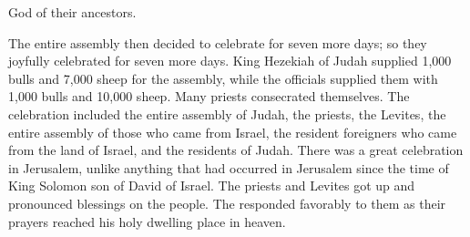 {{}
God
of their ancestors.
\par }{\PP {}The entire
assembly
then decided
to celebrate
for seven
more days;
so
they joyfully
celebrated
for seven
more days.
King
Hezekiah
of Judah
supplied
1,000
bulls
and 7,000
sheep
for the assembly,
while the officials
supplied
them with 1,000
bulls
and 10,000
sheep.
Many
priests
consecrated themselves.
The celebration
included the entire
assembly
of Judah,
the priests,
the Levites,
the entire
assembly
of those who came
from Israel,
the resident foreigners
who came
from the land
of Israel,
and the residents
of Judah.
There was
a great
celebration
in Jerusalem,
unlike
anything that
had occurred
in Jerusalem
since
the time
of King
Solomon
son
of David
of Israel.
The priests
and Levites
got
up and pronounced blessings
on the
people.
The
{} responded
favorably
to them as their prayers
reached
his holy
dwelling place
in heaven.

}
